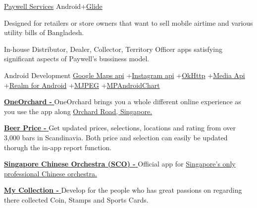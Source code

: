 \begin{projectentries}
    \projectentry 
    {\href{https://play.google.com/store/apps/details?id=com.cloudwell.paywell.services}{Paywell Services}} 
    {Android+{\href{https://github.com/bumptech/glide}{Glide}}}
    {
      \begin{projectitems} %
        \item {Designed for retailers or store owners that want to sell mobile airtime and various utility bills of Bangladesh.}
        \item {In-house Distributor, Dealer, Collector, Territory Officer 
        apps satisfying significant aspects of Paywell's bussiness model.}
      \end{projectitems}
    }

    \projectentry 
    {Android Development} 
    {{\href{https://developers.google.com/maps/documentation/android-sdk/start}{Google Maps api}}
    +{\href{https://www.instagram.com/developer/}{Instagram api}}
    +{\href{http://square.github.io/okhttp/}{OkHttp}}
    +{\href{https://developer.android.com/guide/topics/media/}{Media Api}}
    +{\href{https://realm.io/docs/java/latest/}{Realm for Android}}
    +{\href{https://en.wikipedia.org/wiki/Motion_JPEG}{MJPEG}}
    +{\href{https://github.com/PhilJay/MPAndroidChart}{MPAndroidChart}}}
    {
      \begin{projectitems} %
        \item {{\href{https://play.google.com/store/apps/details?id=com.orba.OneOrchard}{\textbf{OneOrchard - }}}
        OneOrchard brings you a whole different online experience as you use the app along 
        {\href{http://www.orchardroad.org/}{Orchard Road, Singapore.}}}
        \item {{\href{https://annanovas.com/portfolio/beer-prices-android/}{\textbf{Beer Price - }}}
        Get updated prices, selections, locations and rating from over 3,000 bars in Scandinavia. Both price and selection can easily be 
        updated thorugh the in-app report function.}  
        \item {{\href{https://play.google.com/store/apps/details?id=com.SingaporeChineseOrchestra.SCO}{\textbf{Singapore Chinese Orchestra (SCO) - }}}
        Official app for 
        {\href{https://www.sco.com.sg}{Singapore’s only professional Chinese orchestra.}}}  
        \item {{\href{https://annanovas.com/portfolio/my-collection/}{\textbf{My Collection - }}}
        Develop for the people who has great passions on regarding there collected Coin, Stamps and Sports Cards.}  

\end{projectitems}}
\end{projectentries}
